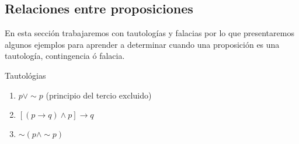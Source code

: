 \subsection{\label{sub:Relaciones-entre-proposiciones}Relaciones entre proposiciones}

En esta sección trabajaremos con tautologías y falacias por lo que
presentaremos algunos ejemplos para aprender a determinar cuando una
proposición es una tautología, contingencia ó falacia.

\begin{ejems}{Tautológias}
\begin{enumerate}
\item $p\vee\sim p$ (principio del tercio excluido) 
\item $\left[(p\rightarrow q)\wedge p\right]\rightarrow q$
\item $\sim\left(p\wedge\sim p\right)$
\end{enumerate}
\end{ejems}

